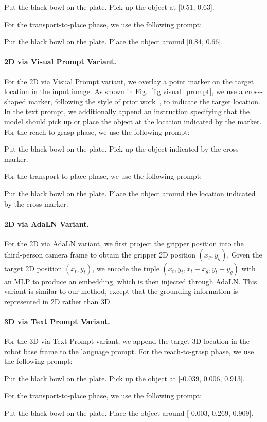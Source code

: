 \begin{promptbox}
Put the black bowl on the plate. Pick up the object at [0.51, 0.63].
\end{promptbox}

For the transport-to-place phase, we use the following prompt:
\begin{promptbox}
Put the black bowl on the plate. Place the object around [0.84, 0.66].
\end{promptbox}

\paragraph{2D via Visual Prompt Variant.}

For the 2D via Visual Prompt variant, we overlay a point marker on the target location in the input image. As shown in Fig.~\ref{fig:visual_prompt}, we use a cross-shaped marker, following the style of prior work~\cite{wang2026vp}, to indicate the target location. In the text prompt, we additionally append an instruction specifying that the model should pick up or place the object at the location indicated by the marker. For the reach-to-grasp phase, we use the following prompt:

\begin{promptbox}
Put the black bowl on the plate. Pick up the object indicated by the cross marker.
\end{promptbox}

For the transport-to-place phase, we use the following prompt:
\begin{promptbox}
Put the black bowl on the plate. Place the object around the location indicated by the cross marker.
\end{promptbox}

\paragraph{2D via AdaLN Variant.}
For the 2D via AdaLN variant, we first project the gripper position into the third-person camera frame to obtain the gripper 2D position $(x_g, y_g)$. Given the target 2D position $(x_t, y_t)$, we encode the tuple $(x_t, y_t, x_t - x_g, y_t - y_g)$ with an MLP to produce an embedding, which is then injected through AdaLN. This variant is similar to our method, except that the grounding information is represented in 2D rather than 3D.

\paragraph{3D via Text Prompt Variant.} 
For the 3D via Text Prompt variant, we append the target 3D location in the robot base frame to the language prompt. For the reach-to-grasp phase, we use the following prompt:

\begin{promptbox}
Put the black bowl on the plate. Pick up the object at [-0.039, 0.006, 0.913].
\end{promptbox}

For the transport-to-place phase, we use the following prompt:
\begin{promptbox}
Put the black bowl on the plate. Place the object around [-0.003, 0.269, 0.909].
\end{promptbox}